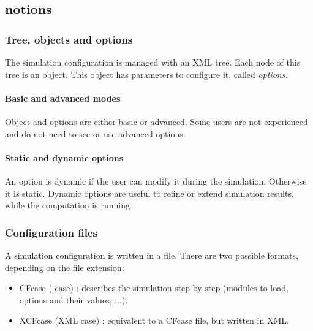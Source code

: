 \subsection{\cf notions}

\subsubsection{Tree, objects and options}

The simulation configuration is managed with an XML tree. Each node of this
tree is an object. This object has parameters to configure it, called
\textit{options}.


\paragraph{Basic and advanced modes\\}

Object and options are either basic or advanced. Some users are not experienced
and do not need to see or use advanced options.


\paragraph{Static and dynamic options\\}

An option is dynamic if the user can modify it during the simulation. Otherwise
it is static. Dynamic options are useful to refine or extend simulation
results, while the computation is running.


\subsubsection{Configuration files}

A simulation configuration is written in a file. There are two possible
formats, depending on the file extension:
\begin{itemize}
 \item CFcase (\textit{\cf} case) : describes the simulation step by
step (modules to load, options and their values, ...).
 \item XCFcase (XML \textit{\cf} case) : equivalent to a CFcase file, but
written in XML.
\end{itemize}

